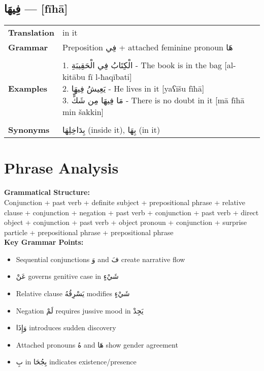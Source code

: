 \documentclass[letter,12pt]{article}
\begin{document}
\subsection{\textarabic{فِيهَا} — [fīhā]}
\begin{tabular}{p{3cm}p{10cm}}
\toprule
\textbf{Translation} & in it \\
\textbf{Grammar} & Preposition \textarabic{فِي} + attached feminine pronoun \textarabic{هَا} \\
\midrule \\
\textbf{Examples} & \makecell[l]{\parbox{9.5cm}{
1. \textarabic{الْكِتَابُ فِي الْحَقِيبَةِ} - The book is in the bag [al-kitābu fī l-ħaqībati]\\
2. \textarabic{يَعِيشُ فِيهَا} - He lives in it [yaʕīšu fīhā]\\
3. \textarabic{مَا فِيهَا مِن شَكٍّ} - There is no doubt in it [mā fīhā min šakkin]
}} \\
\midrule \\
\textbf{Synonyms} & \textarabic{بِدَاخِلِهَا} (inside it), \textarabic{بِهَا} (in it) \\
\bottomrule
\end{tabular}

\section{Phrase Analysis}
\begin{tcolorbox}[colback=boxcolor,colframe=headercolor,breakable]
\textbf{Grammatical Structure:}\\
Conjunction + past verb + definite subject + prepositional phrase + relative clause + conjunction + negation + past verb + conjunction + past verb + direct object + conjunction + past verb + object pronoun + conjunction + surprise particle + prepositional phrase + prepositional phrase \\

\textbf{Key Grammar Points:}
\begin{itemize}
\item Sequential conjunctions \textarabic{وَ} and \textarabic{فَ} create narrative flow
\item \textarabic{عَنْ} governs genitive case in \textarabic{شَيْءٍ}
\item Relative clause \textarabic{يَسْرِقُهُ} modifies \textarabic{شَيْءٍ}
\item Negation \textarabic{لَمْ} requires jussive mood in \textarabic{يَجِدْ}
\item \textarabic{وَإِذَا} introduces sudden discovery
\item Attached pronouns \textarabic{هُ} and \textarabic{هَا} show gender agreement
\item \textarabic{بِ} in \textarabic{بِجُحَا} indicates existence/presence
\end{itemize}
\end{tcolorbox}
\end{document}
